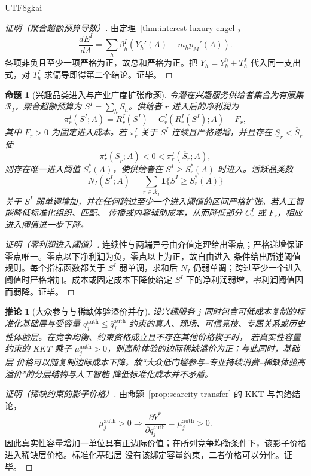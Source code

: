 \documentclass[12pt,a4paper,openany]{report}
\newtheorem{proposition}{命题}[chapter]
\newtheorem{corollary}{推论}[chapter]
\begin{document}
\begin{CJK*}{UTF8}{gkai}
\begin{proof}[证明（聚合超额预算导数）]
由定理~\ref{thm:interest-luxury-engel}，
\[
  \frac{dE^I}{dA}
  =\sum_h\beta_h^I
  \left(Y_h'(A)-\bar m_hp_M'(A)\right).
\]
各项非负且至少一项严格为正，故总和严格为正。把 \(Y_h=Y_h^0+T_h^I\) 代入同一支出式，对
\(T_h^I\) 求偏导即得第二个结论。证毕。
\end{proof}

\begin{proposition}[兴趣品类进入与产业广度扩张命题]
\label{prop:interest-variety-entry}
令潜在兴趣服务供给者集合为有限集 \(\mathcal R_I\)，聚合超额预算为
\(S^I=\sum_hS_h\)。供给者 \(r\) 进入后的净利润为
\[
  \pi_r^I(S^I;A)
  =R_r^I(S^I)-C_r^I(R_r^I(S^I);A)-F_r,
\]
其中 \(F_r>0\) 为固定进入成本。若 \(\pi_r^I\) 关于 \(S^I\) 连续且严格递增，并且存在
\(\underline S_r<\overline S_r\) 使
\[
  \pi_r^I(\underline S_r;A)<0
  <\pi_r^I(\overline S_r;A),
\]
则存在唯一进入阈值 \(S_r^*(A)\)，使供给者在 \(S^I\ge S_r^*(A)\) 时进入。活跃品类数
\[
  N_I(S^I;A)
  =\sum_{r\in\mathcal R_I}
  \mathbf 1\{S^I\ge S_r^*(A)\}
\]
关于 \(S^I\) 弱单调增加，并在任何跨过至少一个进入阈值的区间严格扩张。若人工智能降低标准化组织、匹配、
传播或内容辅助成本，从而降低部分 \(C_r^I\) 或 \(F_r\)，相应进入阈值进一步下降。
\end{proposition}

\begin{proof}[证明（零利润进入阈值）]
连续性与两端异号由介值定理给出零点；严格递增保证零点唯一。零点以下净利润为负，零点以上为正，故自由进入
条件给出所述阈值规则。每个指标函数都关于 \(S^I\) 弱单调，求和后 \(N_I\) 仍弱单调；跨过至少一个进入
阈值时严格增加。成本或固定成本下降使给定 \(S^I\) 下的净利润弱增，零利润阈值因而弱降。证毕。
\end{proof}

\begin{corollary}[大众参与与稀缺体验溢价并存]
\label{cor:mass-access-authenticity-premium}
设兴趣服务 \(j\) 同时包含可低成本复制的标准化基础层与受容量
\(
  q_j^{\mathrm{auth}}\le\bar q_j^{\mathrm{auth}}
\)
约束的真人、现场、可信竞技、专属关系或历史性体验层。在竞争均衡、约束资格成立且不存在其他价格楔子时，
若真实性容量约束的 KKT 乘子 \(\mu_j^{\mathrm{auth}}>0\)，则高阶体验的边际稀缺溢价为正；与此同时，基础层
价格可以随复制边际成本下降。故“大众低门槛参与--专业持续消费--稀缺体验高溢价”的分层结构与人工智能
降低标准化成本并不矛盾。
\end{corollary}

\begin{proof}[证明（稀缺约束的影子价格）]
由命题~\ref{prop:scarcity-transfer} 的 KKT 与包络结论，
\[
  \mu_j^{\mathrm{auth}}>0
  \Longrightarrow
  \frac{\partial Y^*}{\partial\bar q_j^{\mathrm{auth}}}
  =\mu_j^{\mathrm{auth}}>0.
\]
因此真实性容量增加一单位具有正边际价值；在所列竞争均衡条件下，该影子价格进入稀缺层价格。标准化基础层
没有该绑定容量约束，二者价格可以分化。证毕。
\end{proof}


\end{CJK*}
\end{document}
